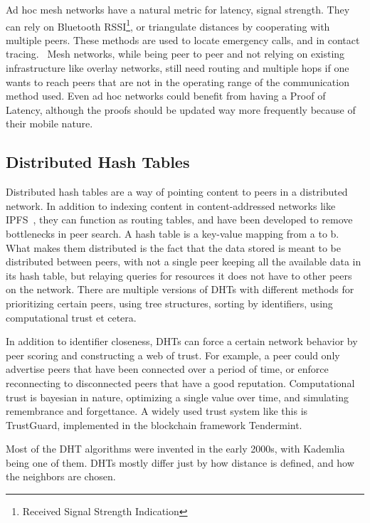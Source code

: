 Ad hoc mesh networks have a natural metric for latency, signal strength. They can rely on Bluetooth RSSI\footnote{Received Signal Strength Indication}, or triangulate distances by cooperating with multiple peers. These methods are used to locate emergency calls, and in contact tracing.~\cite{Biddle2020-kl} Mesh networks, while being peer to peer and not relying on existing infrastructure like overlay networks, still need routing and multiple hops if one wants to reach peers that are not in the operating range of the communication method used. Even ad hoc networks could benefit from having a Proof of Latency, although the proofs should be updated way more frequently because of their mobile nature.

\subsection{Distributed Hash Tables}
Distributed hash tables are a way of pointing content to peers in a distributed network. In addition to indexing content in content-addressed networks like IPFS~\cite{Labs_undated-uw}, they can function as routing tables, and have been developed to remove bottlenecks in peer search. A hash table is a key-value mapping from a to b. What makes them distributed is the fact that the data stored is meant to be distributed between peers, with not a single peer keeping all the available data in its hash table, but relaying queries for resources it does not have to other peers on the network. There are multiple versions of DHTs with different methods for prioritizing certain peers, using tree structures, sorting by identifiers, using computational trust et cetera.

In addition to identifier closeness, DHTs can force a certain network behavior by peer scoring and constructing a web of trust. For example, a peer could only advertise peers that have been connected over a period of time, or enforce reconnecting to disconnected peers that have a good reputation. Computational trust is bayesian in nature, optimizing a single value over time, and simulating remembrance and forgettance. A widely used trust system like this is TrustGuard, implemented in the blockchain framework Tendermint.~\cite{Srivatsa2005-ib, Jeff_Foley2018-zt}

Most of the DHT algorithms were invented in the early 2000s, with Kademlia being one of them. DHTs mostly differ just by how distance is defined, and how the neighbors are chosen.~\cite{Cai2015-ra}

